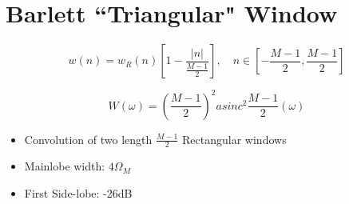 \documentclass[11pt]{article}
\begin{document}
\section*{Barlett ``Triangular" Window} \indent

\[w(n) = w_R(n) [1 - \frac{|n|}{\frac{M-1}{2}}],\quad n \in [-\frac{M-1}{2}, \frac{M-1}{2}]\]

\[W(\omega) = \left(\frac{M-1}{2}\right)^2 asinc^2 \frac{M-1}{2}(\omega)\]

\begin{itemize}
\item Convolution of two length $\frac{M-1}{2}$ Rectangular windows
\item Mainlobe width: $4\Omega_M$
\item First Side-lobe: -26dB
\end{itemize}
\end{document}
